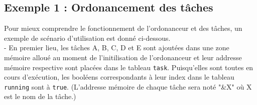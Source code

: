\subsection{Exemple 1 : Ordonancement des tâches}
\label{subsec:exemple_1}

Pour mieux comprendre le fonctionnement de l'ordonanceur et des tâches, un exemple de scénario
d'utilisation est donné ci-dessous.\\

- En premier lieu, les tâches A, B, C, D et E sont ajoutées dans une zone mémoire alloué au moment de
l'initilisation de l'ordonanceur et leur addresse mémoire respective sont placées dans le tableau
\texttt{task}. Puisqu'elles sont toutes en cours d'exécution, les booléens correspondants à leur index
dans le tableau \texttt{running} sont à \texttt{true}. (L'addresse mémoire de chaque tâche sera noté
"\&X" où X est le nom de la tâche.) 

